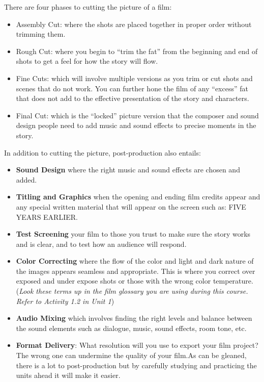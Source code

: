 \documentclass[
  letterpaper,
  DIV=11,
  numbers=noendperiod]{scrreprt}
\providecommand{\tightlist}{%
  \setlength{\itemsep}{0pt}\setlength{\parskip}{0pt}}\usepackage{longtable,booktabs,array}
\begin{document}
There are four phases to cutting the picture of a film:

\begin{itemize}
\tightlist
\item
  Assembly Cut: where the shots are placed together in proper order
  without trimming them.
\item
  Rough Cut: where you begin to ``trim the fat'' from the beginning and
  end of shots to get a feel for how the story will flow.
\item
  Fine Cuts: which will involve multiple versions as you trim or cut
  shots and scenes that do not work. You can further hone the film of
  any ``excess'' fat that does not add to the effective presentation of
  the story and characters.
\item
  Final Cut: which is the ``locked'' picture version that the composer
  and sound design people need to add music and sound effects to precise
  moments in the story.
\end{itemize}

In addition to cutting the picture, post-production also entails:

\begin{itemize}
\tightlist
\item
  \textbf{Sound Design} where the right music and sound effects are
  chosen and added.
\item
  \textbf{Titling and Graphics} when the opening and ending film credits
  appear and any special written material that will appear on the screen
  such as: FIVE YEARS EARLIER.
\item
  \textbf{Test Screening} your film to those you trust to make sure the
  story works and is clear, and to test how an audience will respond.
\item
  \textbf{Color Correcting} where the flow of the color and light and
  dark nature of the images appears seamless and appropriate. This is
  where you correct over exposed and under expose shots or those with
  the wrong color temperature. (\emph{Look these terms up in the film
  glossary you are using during this course. Refer to Activity 1.2 in
  Unit 1})
\item
  \textbf{Audio Mixing} which involves finding the right levels and
  balance between the sound elements such as dialogue, music, sound
  effects, room tone, etc.
\item
  \textbf{Format Delivery}: What resolution will you use to export your
  film project? The wrong one can undermine the quality of your film.As
  can be gleaned, there is a lot to post-production but by carefully
  studying and practicing the units ahead it will make it easier.
\end{itemize}
\end{document}
